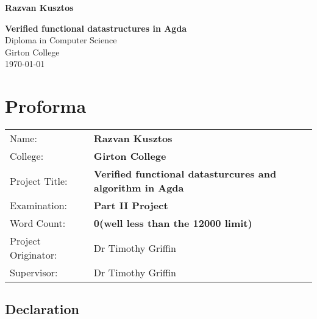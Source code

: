 \documentclass[12pt,twoside,notitlepage]{report}
\begin{document}





\pagestyle{empty}

\hfill{\LARGE \bf Razvan Kusztos}

\vspace*{60mm}
\begin{center}
\Huge
{\bf Verified functional datastructures in Agda} \\
\vspace*{5mm}
Diploma in Computer Science \\
\vspace*{5mm}
Girton College \\
\vspace*{5mm}
\today  %
\end{center}

\cleardoublepage


\setcounter{page}{1}
\pagestyle{plain}

\chapter*{Proforma}

{\large
\begin{tabular}{ll}
Name:               & \bf Razvan Kusztos                       \\
College:            & \bf Girton College                     \\
Project Title:      & \bf Verified functional datasturcures and algorithm in Agda \\
Examination:        & \bf Part II Project        \\
Word Count:         & \bf 0\footnotemark[1]
(well less than the 12000 limit) \\
Project Originator: & Dr Timothy Griffin                    \\
Supervisor:         & Dr Timothy Griffin                    \\
\end{tabular}
}

\newpage
\section*{Declaration}
\end{document}
